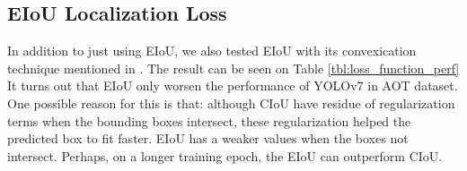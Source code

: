 \documentclass[conference]{IEEEtran}
\begin{document}
\subsection{EIoU Localization Loss}
In addition to just using EIoU, we also tested EIoU with its convexication technique 
mentioned in \cite{eiou}. The result can be seen on Table \ref{tbl:loss_function_perf}
It turns out that EIoU only worsen the performance of YOLOv7 in AOT dataset.
One possible reason for this is that: although CIoU have residue of regularization terms when the bounding boxes intersect,
these regularization helped the predicted box to fit faster. EIoU has a weaker values when the boxes not intersect.
Perhaps, on a longer training epoch, the EIoU can outperform CIoU.
\begin{table}[htbp]
  \centering
  \label{tbl:loss_function_perf}
  \vspace{-1ex}
  
\end{table}
\end{document}
